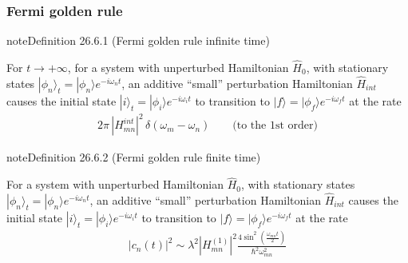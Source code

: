 \documentclass[letterpaper,10pt,english]{jupyterBook}
\begin{document}
\subsubsection{Fermi golden rule}
\label{\detokenize{ch/quantum-mechanics/qft/interactions-perturbation:fermi-golden-rule}}\label{ch/quantum-mechanics/qft/interactions-perturbation:qft:fermi-golden-rule}
\begin{sphinxadmonition}{note}{Definition 26.6.1 (Fermi golden rule \sphinxhyphen{} infinite time)}



\sphinxAtStartPar
For \(t \rightarrow +\infty\), for a system with unperturbed Hamiltonian \(\hat H_0\), with stationary states \(|\phi_n\rangle_t=|\phi_n\rangle e^{-i\omega_nt}\), an additive “small” perturbation Hamiltonian \(\hat{H}_{int}\) causes the initial state \(|i\rangle_t=|\phi_i\rangle e^{-i\omega_it}\) to transition to \(|f\rangle=|\phi_f\rangle e^{-i\omega_ft}\) at the rate
\begin{equation*}
\begin{split}2\pi\,|H^{int}_{mn}|^2\,\delta(\omega_m-\omega_n)\qquad\text{(to the 1st order)}\end{split}
\end{equation*}

\end{sphinxadmonition}
\label{ch/quantum-mechanics/qft/interactions-perturbation:qft:fermi-golden-rule-finite}
\begin{sphinxadmonition}{note}{Definition 26.6.2 (Fermi golden rule \sphinxhyphen{} finite time)}



\sphinxAtStartPar
For a system with unperturbed Hamiltonian \(\hat H_0\), with stationary states \(|\phi_n\rangle_t=|\phi_n\rangle e^{-i\omega_nt}\), an additive “small” perturbation Hamiltonian \(\hat{H}_{int}\) causes the initial state \(|i\rangle_t=|\phi_i\rangle e^{-i\omega_it}\) to transition to \(|f\rangle=|\phi_f\rangle e^{-i\omega_ft}\) at the rate
\begin{equation*}
\begin{split}
|c_n(t)|^2\sim\lambda^2|H^{(1)}_{mn}|^2\frac{4\sin^2\!\left(\frac{\omega_{mn}t}{2}\right)}{\hbar^2\omega_{mn}^2}
\end{split}
\end{equation*}

\end{sphinxadmonition}
\end{document}

